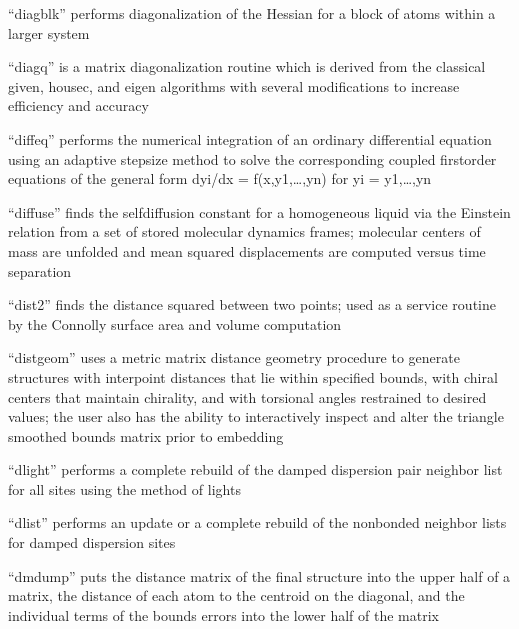\documentclass[letterpaper,11pt,english]{sphinxmanual}
\begin{document}

“diagblk” performs diagonalization of the Hessian for a
block of atoms within a larger system


“diagq” is a matrix diagonalization routine which is derived
from the classical given, housec, and eigen algorithms with
several modifications to increase efficiency and accuracy


“diffeq” performs the numerical integration of an ordinary
differential equation using an adaptive stepsize method to
solve the corresponding coupled first\sphinxhyphen{}order equations of the
general form dyi/dx = f(x,y1,…,yn) for yi = y1,…,yn


“diffuse” finds the self\sphinxhyphen{}diffusion constant for a homogeneous
liquid via the Einstein relation from a set of stored molecular
dynamics frames; molecular centers of mass are unfolded and mean
squared displacements are computed versus time separation


“dist2” finds the distance squared between two points; used
as a service routine by the Connolly surface area and volume
computation


“distgeom” uses a metric matrix distance geometry procedure to
generate structures with interpoint distances that lie within
specified bounds, with chiral centers that maintain chirality,
and with torsional angles restrained to desired values; the
user also has the ability to interactively inspect and alter
the triangle smoothed bounds matrix prior to embedding


“dlight” performs a complete rebuild of the damped dispersion
pair neighbor list for all sites using the method of lights


“dlist” performs an update or a complete rebuild of the
nonbonded neighbor lists for damped dispersion sites


“dmdump” puts the distance matrix of the final structure
into the upper half of a matrix, the distance of each atom
to the centroid on the diagonal, and the individual terms
of the bounds errors into the lower half of the matrix
\end{document}

